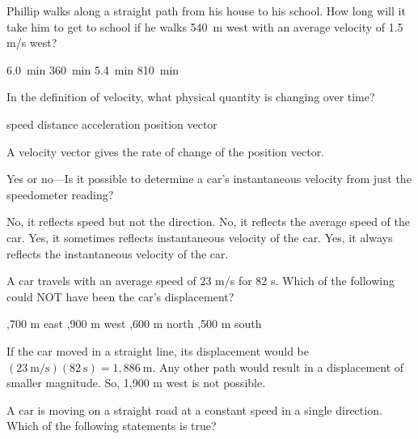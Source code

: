 \documentclass[]{exam}
\begin{document}
\begin{questions}
\begin{questions}
\question %
Phillip walks along a straight path from his house to his school. How long will it take him to get to school if he walks \SI{540}{m} west with an average velocity of 1.5 m/s west?

\begin{choices}
\CorrectChoice \SI{6.0}{min}
\choice \SI{360}{min}
\choice \SI{5.4}{min}
\choice \SI{810}{min}


\end{choices}

\question
In the definition of velocity, what physical quantity is changing over time?

\begin{choices}
\choice speed
\choice distance
\choice acceleration
\CorrectChoice position vector
\end{choices}

\begin{solution}
A velocity vector gives the rate of change of the position vector.
\end{solution}

\question
Yes or no---Is it possible to determine a car’s instantaneous velocity from just the speedometer reading?

\begin{choices}
\CorrectChoice No, it reflects speed but not the direction.
\choice No, it reflects the average speed of the car.
\choice Yes, it sometimes reflects instantaneous velocity of the car.
\choice Yes, it always reflects the instantaneous velocity of the car.
\end{choices}

\question
A car travels with an average speed of 23 m/s for 82 s. Which of the following could NOT have been the car's displacement?

\begin{choices}
,700 m east
,900 m west
,600 m north
,500 m south
\end{choices}

\begin{solution}
If the car moved in a straight line, its displacement would be $(23\ \mathrm{m/s})(82\ \mathrm{s}) = 1,886\ \mathrm{m}$. Any other path would result in a displacement of smaller magnitude. So, 1,900 m west is not possible.
\end{solution}

\question 
A car is moving on a straight road at a constant speed in a single direction. Which of the following statements is true?


\end{questions}
\end{questions}
\end{document}
